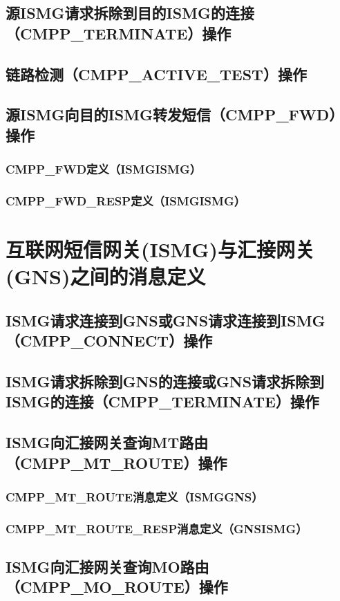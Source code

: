 \documentclass[11pt]{book} %
\begin{document}
\subsection{源ISMG请求拆除到目的ISMG的连接（CMPP\_TERMINATE）操作}

\subsection{链路检测（CMPP\_ACTIVE\_TEST）操作}
\subsection{源ISMG向目的ISMG转发短信（CMPP\_FWD）操作}
\subsubsection{CMPP\_FWD定义（ISMG\textrightarrow ISMG）}
\subsubsection{CMPP\_FWD\_RESP定义（ISMG\textrightarrow ISMG）}
\section{互联网短信网关(ISMG)与汇接网关(GNS)之间的消息定义}
\subsection{ISMG请求连接到GNS或GNS请求连接到ISMG（CMPP\_CONNECT）操作}
\subsection{ISMG请求拆除到GNS的连接或GNS请求拆除到ISMG的连接（CMPP\_TERMINATE）操作}
\subsection{ISMG向汇接网关查询MT路由（CMPP\_MT\_ROUTE）操作}
\subsubsection{CMPP\_MT\_ROUTE消息定义（ISMG\textrightarrow GNS）}
\subsubsection{CMPP\_MT\_ROUTE\_RESP消息定义（GNS\textrightarrow ISMG）}
\subsection{ISMG向汇接网关查询MO路由（CMPP\_MO\_ROUTE）操作}
\end{document}
